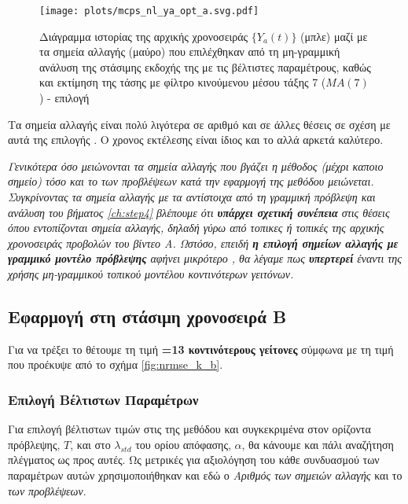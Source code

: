 \begin{figure}[H]
    \begin{center}
        \texttt{[image: plots/mcps\_nl\_ya\_opt\_a.svg.pdf]}
        \caption{Διάγραμμα ιστορίας της αρχικής χρονοσειράς $\{Y_a(t)\}$ (μπλε) μαζί με τα σημεία αλλαγής (μαύρο) που επιλέχθηκαν από τη μη-γραμμική ανάλυση της στάσιμης εκδοχής της με τις βέλτιστες παραμέτρους, καθώς και εκτίμηση της τάσης με φίλτρο κινούμενου μέσου τάξης 7 ($MA(7)$ ) - επιλογή }
        \label{fig:mcps_nl_ya_opt_a}
    \end{center}
\end{figure}

Τα σημεία αλλαγής είναι πολύ λιγότερα σε αριθμό και σε άλλες θέσεις σε σχέση με αυτά της επιλογής . Ο χρονος εκτέλεσης είναι ίδιος και το αλλά  αρκετά καλύτερο. 

\par \textit{Γενικότερα όσο μειώνονται τα σημεία αλλαγής που βγάζει η μέθοδος (μέχρι καποιο σημείο) τόσο και το  των προβλέψεων κατά την εφαρμογή της μεθόδου μειώνεται.\\
Συγκρίνοντας τα σημεία αλλαγής με τα αντίστοιχα από τη γραμμική πρόβλεψη και ανάλυση του βήματος \ref{ch:step4} βλέπουμε ότι \textbf{υπάρχει σχετική συνέπεια} στις θέσεις όπου εντοπίζονται σημεία αλλαγής, δηλαδή γύρω από τοπικες  ή τοπικές  της αρχικής χρονοσειράς προβολών του βίντεο A. Ωστόσο, επειδή \textbf{η επιλογή σημείων αλλαγής με γραμμικό μοντέλο πρόβλεψης} αφήνει μικρότερο , θα λέγαμε πως \textbf{υπερτερεί} έναντι της χρήσης μη-γραμμικού τοπικού μοντέλου κοντινότερων γειτόνων.}




\subsection{Εφαρμογή στη στάσιμη χρονοσειρά Β}

Για να τρέξει το  θέτουμε τη τιμή \textbf{=13 κοντινότερους γείτονες} σύμφωνα με τη τιμή που προέκυψε από το σχήμα \ref{fig:nrmse_k_b}.

\subsubsection{Επιλογή Βέλτιστων Παραμέτρων}

Για επιλογή βέλτιστων τιμών στις  της μεθόδου και συγκεκριμένα στον ορίζοντα πρόβλεψης, $T$, και στο $\lambda_{std}$ του ορίου απόφασης, $\alpha$, θα κάνουμε και πάλι αναζήτηση πλέγματος ως προς αυτές. Ως μετρικές για αξιολόγηση του κάθε συνδυασμού των παραμέτρων αυτών χρησιμοποιήθηκαν και εδώ ο \textit{Αριθμός των σημειών αλλαγής } και το \textit{ των προβλέψεων}.

